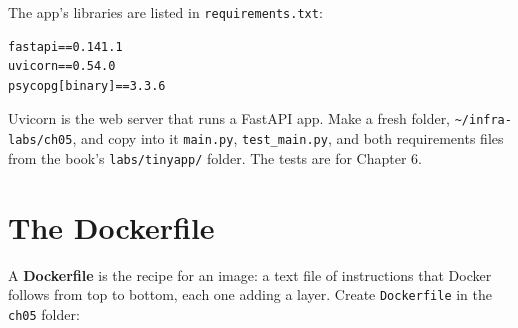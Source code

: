 
The app's libraries are listed in \texttt{requirements.txt}:

\begin{codeblock}
\begin{Verbatim}[formatcom=\outputstyle]
fastapi==0.141.1
uvicorn==0.54.0
psycopg[binary]==3.3.6
\end{Verbatim}
\end{codeblock}

Uvicorn is the web server that runs a FastAPI app. Make a fresh folder, \texttt{\textasciitilde{}/infra-labs/ch05}, and copy into it \texttt{main.py}, \texttt{test\_main.py}, and both requirements files from the book's \texttt{labs/tinyapp/} folder. The tests are for Chapter 6.


\section{The Dockerfile}\label{05-docker-in-practice:the-dockerfile}

A \textbf{Dockerfile} is the recipe for an image: a text file of instructions that Docker follows from top to bottom, each one adding a layer. Create \texttt{Dockerfile} in the \texttt{ch05} folder:

\begin{codeblock}

\begin{Shaded}
\begin{Highlighting}[]


  


  \KeywordTok{\&\&} \KeywordTok{\&\&} 

\NormalTok{ [}\NormalTok{, }\NormalTok{, }\NormalTok{, }\NormalTok{, }\NormalTok{, }\NormalTok{]}
\end{Highlighting}
\end{Shaded}

\end{codeblock}

